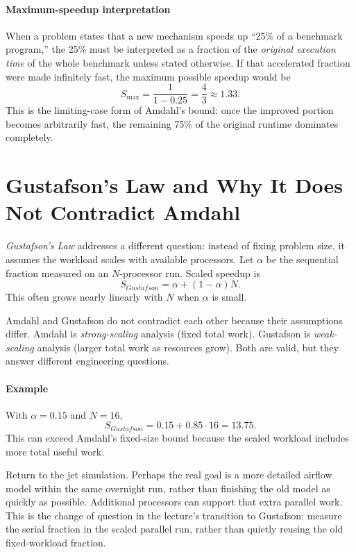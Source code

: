 \paragraph{Maximum-speedup interpretation}\label{par:auto-010a}
When a problem states that a new mechanism speeds up ``25\% of a benchmark program,'' the 25\% must be interpreted as a fraction of the \emph{original execution time} of the whole benchmark unless stated otherwise.
If that accelerated fraction were made infinitely fast, the maximum possible speedup would be
\begin{equation}\label{eq:auto-012a}
    S_{\max}=\frac{1}{1-0.25}=\frac{4}{3}\approx 1.33.
\end{equation}
This is the limiting-case form of Amdahl's bound: once the improved portion becomes arbitrarily fast, the remaining 75\% of the original runtime dominates completely.


\section{Gustafson's Law and Why It Does Not Contradict Amdahl}\label{sec:auto-015}
\textit{Gustafson's Law} addresses a different question: instead of fixing problem size, it assumes the workload scales with available processors.
Let $\alpha$ be the sequential fraction measured on an $N$-processor run.
Scaled speedup is
\begin{equation}\label{eq:auto-013}
    S_{Gustafson}=\alpha + (1-\alpha)N.
\end{equation}
This often grows nearly linearly with $N$ when $\alpha$ is small.

Amdahl and Gustafson do not contradict each other because their assumptions differ.
Amdahl is \textit{strong-scaling} analysis (fixed total work).
Gustafson is \textit{weak-scaling} analysis (larger total work as resources grow).
Both are valid, but they answer different engineering questions.

\paragraph{Example}\label{par:auto-011}
With $\alpha=0.15$ and $N=16$,
\begin{equation}\label{eq:auto-014}
    S_{Gustafson}=0.15+0.85\cdot16=13.75.
\end{equation}
This can exceed Amdahl's fixed-size bound because the scaled workload includes more total useful work.

Return to the jet simulation.
Perhaps the real goal is a more detailed airflow model within the same overnight run, rather than finishing the old model as quickly as possible.
Additional processors can support that extra parallel work.
This is the change of question in the lecture's transition to Gustafson: measure the serial fraction in the scaled parallel run, rather than quietly reusing the old fixed-workload fraction.


